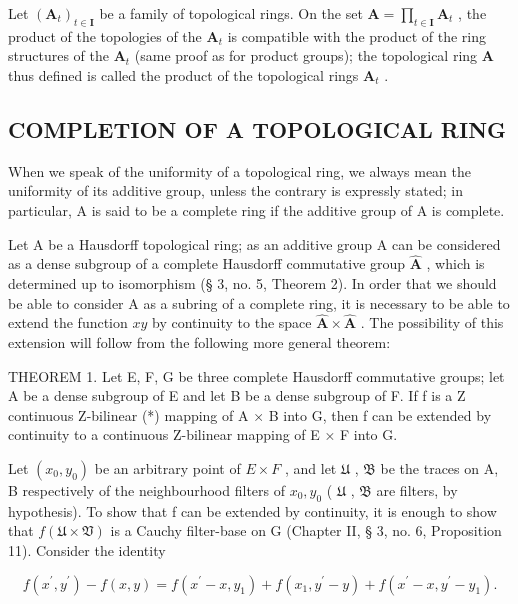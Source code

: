 Let \((\mathbf{A}_t)_{t\in \mathbf{I}}\) be a family of topological rings. On the set \(\mathbf{A} = \prod_{t\in \mathbf{I}}\mathbf{A}_t\) , the product of the topologies of the \(\mathbf{A}_t\) is compatible with the product of the ring structures of the \(\mathbf{A}_t\) (same proof as for product groups); the topological ring \(\mathbf{A}\) thus defined is called the product of the topological rings \(\mathbf{A}_t\) .

\subsection{COMPLETION OF A TOPOLOGICAL RING}

When we speak of the uniformity of a topological ring, we always mean the uniformity of its additive group, unless the contrary is expressly stated; in particular, A is said to be a complete ring if the additive group of A is complete.

Let A be a Hausdorff topological ring; as an additive group A can be considered as a dense subgroup of a complete Hausdorff commutative group \(\hat{\mathbf{A}}\) , which is determined up to isomorphism (§ 3, no. 5, Theorem 2). In order that we should be able to consider A as a subring of a complete ring, it is necessary to be able to extend the function \(xy\) by continuity to the space \(\hat{\mathbf{A}} \times \hat{\mathbf{A}}\) . The possibility of this extension will follow from the following more general theorem:

THEOREM 1. Let E, F, G be three complete Hausdorff commutative groups; let A be a dense subgroup of E and let B be a dense subgroup of F. If f is a Z continuous Z-bilinear (*) mapping of A × B into G, then f can be extended by continuity to a continuous Z-bilinear mapping of E × F into G.

Let \((x_{0}, y_{0})\) be an arbitrary point of \(E \times F\) , and let \(\mathfrak{U}\) , \(\mathfrak{B}\) be the traces on A, B respectively of the neighbourhood filters of \(x_{0}, y_{0}\) ( \(\mathfrak{U}\) , \(\mathfrak{B}\) are filters, by hypothesis). To show that f can be extended by continuity, it is enough to show that \(f(\mathfrak{U} \times \mathfrak{V})\) is a Cauchy filter-base on G (Chapter II, § 3, no. 6, Proposition 11). Consider the identity

\[
f \left(x ^ {\prime}, y ^ {\prime}\right) - f (x, y) = f \left(x ^ {\prime} - x, y _ {1}\right) + f \left(x _ {1}, y ^ {\prime} - y\right) + f \left(x ^ {\prime} - x, y ^ {\prime} - y _ {1}\right).
\]

